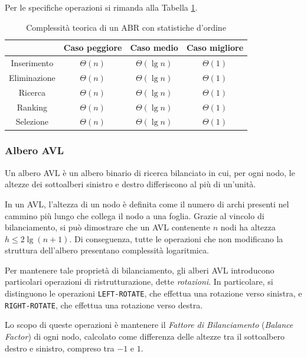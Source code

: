 Per le specifiche operazioni si rimanda alla Tabella \ref{tab:complessita_albero_binario_ricerca}.

\begin{table}[h!]
	\centering
	\begin{tabular}{ |c||c|c|c|  }
		\hhline{~---}
		\multicolumn{1}{c|}{} & Caso peggiore & Caso medio & Caso migliore \\
		\hline
		Inserimento & $\Theta(n)$ & $\Theta(\lg n)$ & $\Theta(1)$\\
		\hline
		Eliminazione & $\Theta(n)$ & $\Theta(\lg n)$ & $\Theta(1)$\\
		\hline
		Ricerca & $\Theta(n)$ & $\Theta(\lg n)$ & $\Theta(1)$\\
		\hline
		Ranking & $\Theta(n)$ & $\Theta(\lg n)$ & $\Theta(1)$\\
		\hline
		Selezione & $\Theta(n)$ & $\Theta(\lg n)$ & $\Theta(1)$\\
		\hline
	\end{tabular}
	\caption{Complessità teorica di un ABR con statistiche d'ordine}
	\label{tab:complessita_albero_binario_ricerca}
\end{table}

\subsubsection*{Albero AVL}
Un albero AVL è un albero binario di ricerca bilanciato in cui, per ogni nodo, le altezze dei sottoalberi sinistro e destro differiscono al più di un’unità.

In un AVL, l’altezza di un nodo è definita come il numero di archi presenti nel cammino più lungo che collega il nodo a una foglia. Grazie al vincolo di bilanciamento, si può dimostrare che un AVL contenente $n$ nodi ha altezza $h \leq 2 \lg(n + 1)$. Di conseguenza, tutte le operazioni che non modificano la struttura dell’albero presentano complessità logaritmica.

Per mantenere tale proprietà di bilanciamento, gli alberi AVL introducono particolari operazioni di ristrutturazione, dette \textit{rotazioni}. In particolare, si distinguono le operazioni \texttt{LEFT-ROTATE}, che effettua una rotazione verso sinistra, e \texttt{RIGHT-ROTATE}, che effettua una rotazione verso destra.

Lo scopo di queste operazioni è mantenere il \textit{Fattore di Bilanciamento} (\textit{Balance Factor}) di ogni nodo, calcolato come differenza delle altezze tra il sottoalbero destro e sinistro, compreso tra $-1$ e $1$.

